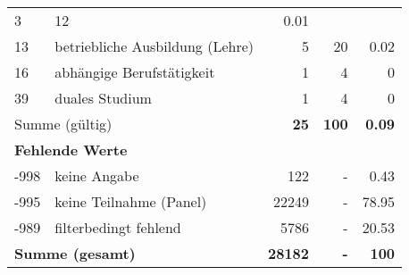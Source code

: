 \begin{longtable}{lXrrr}
       \num{3} &
       \num[round-mode=places,round-precision=2]{12} &
         \num[round-mode=places,round-precision=2]{0,01} \\

     13 &
     \multicolumn{1}{X}{ betriebliche Ausbildung (Lehre)   } &


       \num{5} &
       \num[round-mode=places,round-precision=2]{20} &
         \num[round-mode=places,round-precision=2]{0,02} \\

     16 &
     \multicolumn{1}{X}{ abhängige Berufstätigkeit   } &


       \num{1} &
       \num[round-mode=places,round-precision=2]{4} &
         \num[round-mode=places,round-precision=2]{0} \\

     39 &
     \multicolumn{1}{X}{ duales Studium   } &


       \num{1} &
       \num[round-mode=places,round-precision=2]{4} &
         \num[round-mode=places,round-precision=2]{0} \\
     \midrule
     \multicolumn{2}{l}{Summe (gültig)} &
       \textbf{\num{25}} &
     \textbf{100} &
       \textbf{\num[round-mode=places,round-precision=2]{0,09}} \\
     \multicolumn{5}{l}{\textbf{Fehlende Werte}}\\
       -998 &
       keine Angabe &
         \num{122} &
        - &
         \num[round-mode=places,round-precision=2]{0,43} \\
       -995 &
       keine Teilnahme (Panel) &
         \num{22249} &
        - &
         \num[round-mode=places,round-precision=2]{78,95} \\
       -989 &
       filterbedingt fehlend &
         \num{5786} &
        - &
         \num[round-mode=places,round-precision=2]{20,53} \\
     \midrule
     \multicolumn{2}{l}{\textbf{Summe (gesamt)}} &
          \textbf{\num{28182}} &
        \textbf{-} &
        \textbf{100} \\
     \bottomrule
     \end{longtable}
     
